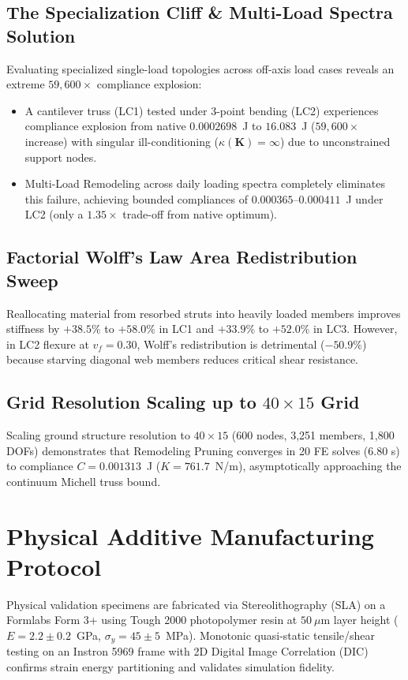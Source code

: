 \documentclass[10pt,journal,compsoc]{IEEEtran}
\begin{document}
\subsection{The Specialization Cliff \& Multi-Load Spectra Solution}
Evaluating specialized single-load topologies across off-axis load cases reveals an extreme $59,600\times$ compliance explosion:
\begin{itemize}
    \item A cantilever truss (LC1) tested under 3-point bending (LC2) experiences compliance explosion from native $0.0002698$~J to $16.083$~J ($59,600\times$ increase) with singular ill-conditioning ($\kappa(\mathbf{K}) = \infty$) due to unconstrained support nodes.
    \item Multi-Load Remodeling across daily loading spectra completely eliminates this failure, achieving bounded compliances of $0.000365$--$0.000411$~J under LC2 (only a $1.35\times$ trade-off from native optimum).
\end{itemize}

\subsection{Factorial Wolff's Law Area Redistribution Sweep}
Reallocating material from resorbed struts into heavily loaded members improves stiffness by $+38.5\%$ to $+58.0\%$ in LC1 and $+33.9\%$ to $+52.0\%$ in LC3. However, in LC2 flexure at $v_f = 0.30$, Wolff's redistribution is detrimental ($-50.9\%$) because starving diagonal web members reduces critical shear resistance.

\subsection{Grid Resolution Scaling up to $40 \times 15$ Grid}
Scaling ground structure resolution to $40 \times 15$ (600 nodes, 3,251 members, 1,800 DOFs) demonstrates that Remodeling Pruning converges in 20 FE solves (6.80 s) to compliance $C = 0.001313$~J ($K = 761.7$~N/m), asymptotically approaching the continuum Michell truss bound.

\section{Physical Additive Manufacturing Protocol}
Physical validation specimens are fabricated via Stereolithography (SLA) on a Formlabs Form 3+ using Tough 2000 photopolymer resin at $50\ \mu\text{m}$ layer height ($E = 2.2 \pm 0.2$~GPa, $\sigma_y = 45 \pm 5$~MPa). Monotonic quasi-static tensile/shear testing on an Instron 5969 frame with 2D Digital Image Correlation (DIC) confirms strain energy partitioning and validates simulation fidelity.
\end{document}
